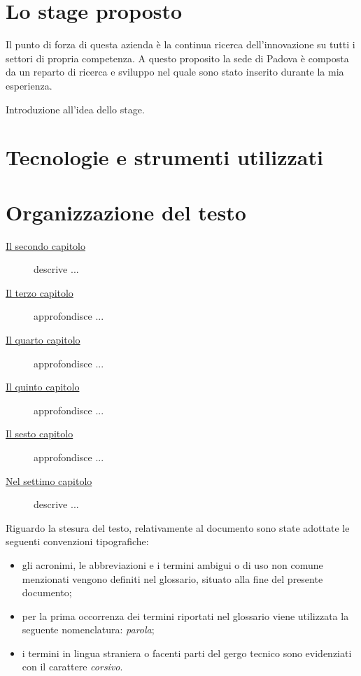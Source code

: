 \section{Lo stage proposto}
Il punto di forza di questa azienda è la continua ricerca dell'innovazione su tutti i settori di propria competenza. A questo proposito la sede di Padova è composta da un reparto di ricerca e sviluppo nel quale sono stato inserito durante la mia esperienza.

Introduzione all'idea dello stage.

\section{Tecnologie e strumenti utilizzati}


\section{Organizzazione del testo}

\begin{description}
    \item[{\hyperref[cap:processi-metodologie]{Il secondo capitolo}}] descrive ...
    
    \item[{\hyperref[cap:descrizione-stage]{Il terzo capitolo}}] approfondisce ...
    
    \item[{\hyperref[cap:analisi-requisiti]{Il quarto capitolo}}] approfondisce ...
    
    \item[{\hyperref[cap:progettazione-codifica]{Il quinto capitolo}}] approfondisce ...
    
    \item[{\hyperref[cap:verifica-validazione]{Il sesto capitolo}}] approfondisce ...
    
    \item[{\hyperref[cap:conclusioni]{Nel settimo capitolo}}] descrive ...
\end{description}

Riguardo la stesura del testo, relativamente al documento sono state adottate le seguenti convenzioni tipografiche:
\begin{itemize}
	\item gli acronimi, le abbreviazioni e i termini ambigui o di uso non comune menzionati vengono definiti nel glossario, situato alla fine del presente documento;
	\item per la prima occorrenza dei termini riportati nel glossario viene utilizzata la seguente nomenclatura: \emph{parola}\glsfirstoccur;
	\item i termini in lingua straniera o facenti parti del gergo tecnico sono evidenziati con il carattere \emph{corsivo}.
\end{itemize}
